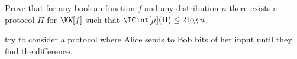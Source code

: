 Prove that for any boolean function $f$ and any distribution $\mu$ there exists a protocol $\Pi$ for
$\KW[f]$ such that $\ICint[\mu](\Pi) \le 2 \log n$.

 try to consider a protocol where Alice sends to Bob bits of her input until they find
the difference.
